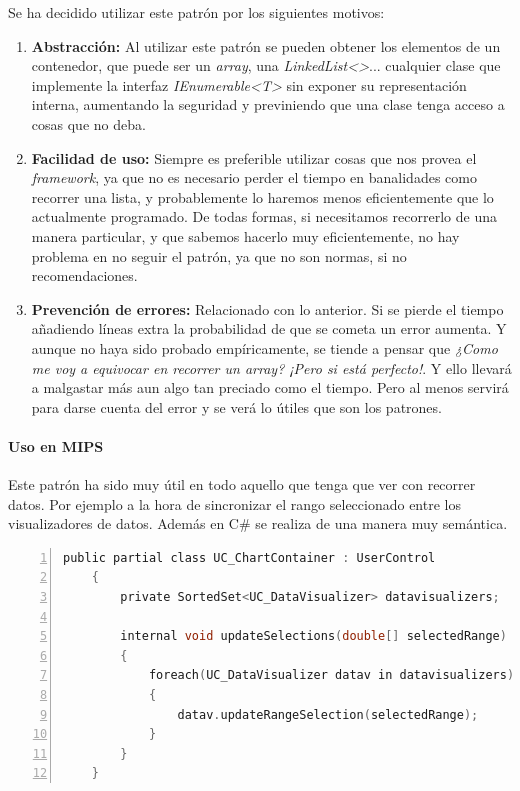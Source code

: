 Se ha decidido utilizar este patr\'{o}n por los siguientes motivos:
\begin{enumerate}
    \item \textbf{Abstracci\'{o}n:}
    Al utilizar este patr\'{o}n se pueden obtener los elementos de un contenedor, que puede ser un \emph{array}, una \emph{LinkedList<>}...
    cualquier clase que implemente la interfaz \emph{IEnumerable<T>} sin
    exponer su representaci\'{o}n interna, aumentando la seguridad y previniendo que una clase tenga acceso a cosas que no deba.
    
    \item \textbf{Facilidad de uso:}
    Siempre es preferible utilizar cosas que nos provea el \emph{framework}, ya que no es necesario perder el tiempo en banalidades como 
    recorrer una lista, y probablemente lo haremos menos eficientemente que lo actualmente programado. De todas formas, si necesitamos
    recorrerlo de una manera particular, y que sabemos hacerlo muy eficientemente, no hay problema en no seguir el patr\'{o}n, ya que no son
    normas, si no recomendaciones.
    
    \item \textbf{Prevenci\'{o}n de errores:}
    Relacionado con lo anterior. Si se pierde el tiempo a\~{n}adiendo l\'{i}neas extra la probabilidad de que se cometa un error 
    aumenta. Y aunque no haya sido probado emp\'{i}ricamente, se tiende a pensar que \emph{¿Como me voy a equivocar en 
    recorrer un array? ¡Pero si est\'{a} perfecto!}. 
    Y ello llevar\'{a} a malgastar m\'{a}s aun algo tan preciado como el tiempo. Pero al menos servir\'a para darse cuenta del error y 
    se ver\'a lo \'{u}tiles que son los patrones.
\end{enumerate}

\paragraph{Uso en MIPS}
Este patr\'on ha sido muy \'util en todo aquello que tenga que ver con recorrer datos. Por ejemplo a la hora de
sincronizar el rango seleccionado entre los visualizadores de datos. Adem\'as en C\# se realiza de una manera 
muy sem\'antica.

\begin{lstlisting}[language=C, numbers=left, showspaces=false, breaklines=true, tabsize=2]
	public partial class UC_ChartContainer : UserControl 
	{
		private SortedSet<UC_DataVisualizer> datavisualizers;
		
		internal void updateSelections(double[] selectedRange)
		{
			foreach(UC_DataVisualizer datav in datavisualizers) 
			{
				datav.updateRangeSelection(selectedRange);
			}
		}
	}
\end{lstlisting}

